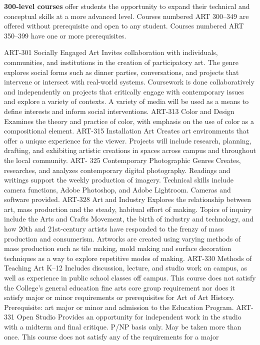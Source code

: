 \documentclass[
  letterpaper,
]{scrbook}
\begin{document}
\textbf{300-level courses} offer students the opportunity to expand
their technical and conceptual skills at a more advanced level. Courses
numbered ART 300--349 are offered without prerequisite and open to any
student. Courses numbered ART 350--399 have one or more prerequisites.

ART-301 Socially Engaged Art Invites collaboration with individuals,
communities, and institutions in the creation of participatory art. The
genre explores social forms such as dinner parties, conversations, and
projects that intervene or intersect with real-world systems. Coursework
is done collaboratively and independently on projects that critically
engage with contemporary issues and explore a variety of contexts. A
variety of media will be used as a means to define interests and inform
social interventions. ART-313 Color and Design Examines the theory and
practice of color, with emphasis on the use of color as a compositional
element. ART-315 Installation Art Creates art environments that offer a
unique experience for the viewer. Projects will include research,
planning, drafting, and exhibiting artistic creations in spaces across
campus and throughout the local community. ART- 325 Contemporary
Photographic Genres Creates, researches, and analyzes contemporary
digital photography. Readings and writings support the weekly production
of imagery. Technical skills include camera functions, Adobe Photoshop,
and Adobe Lightroom. Cameras and software provided. ART-328 Art and
Industry Explores the relationship between art, mass production and the
steady, habitual effort of making. Topics of inquiry include the Arts
and Crafts Movement, the birth of industry and technology, and how 20th
and 21st-century artists have responded to the frenzy of mass production
and consumerism. Artworks are created using varying methods of mass
production such as tile making, mold making and surface decoration
techniques as a way to explore repetitive modes of making. ART-330
Methods of Teaching Art K--12 Includes discussion, lecture, and studio
work on campus, as well as experience in public school classes off
campus. This course does not satisfy the College's general education
fine arts core group requirement nor does it satisfy major or minor
requirements or prerequisites for Art of Art History. Prerequisite: art
major or minor and admission to the Education Program. ART-331 Open
Studio Provides an opportunity for independent work in the studio with a
midterm and final critique. P/NP basis only. May be taken more than
once. This course does not satisfy any of the requirements for a major
\end{document}
